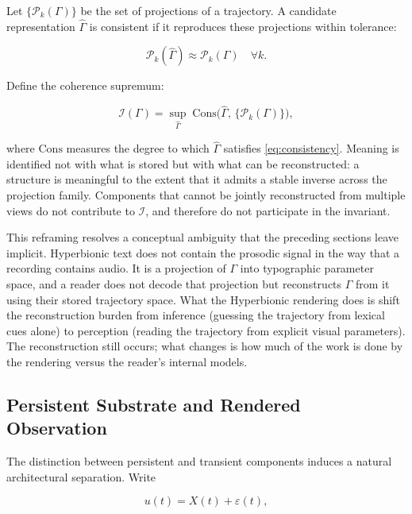 \documentclass[12pt, a4paper]{article}
\begin{document}
Let $\{\mathcal{P}_k(\Gamma)\}$ be the set of projections of a trajectory. A candidate representation $\hat{\Gamma}$ is consistent if it reproduces these projections within tolerance:

\begin{equation}
\mathcal{P}_k(\hat{\Gamma}) \approx \mathcal{P}_k(\Gamma) \quad \forall k.
\label{eq:consistency}
\end{equation}

Define the coherence supremum:

\begin{equation}
\mathcal{I}(\Gamma) = \sup_{\hat{\Gamma}}\; \mathrm{Cons}\!\bigl(\hat{\Gamma},\, \{\mathcal{P}_k(\Gamma)\}\bigr),
\label{eq:coherence_sup}
\end{equation}

where $\mathrm{Cons}$ measures the degree to which $\hat{\Gamma}$ satisfies \eqref{eq:consistency}. Meaning is identified not with what is stored but with what can be reconstructed: a structure is meaningful to the extent that it admits a stable inverse across the projection family. Components that cannot be jointly reconstructed from multiple views do not contribute to $\mathcal{I}$, and therefore do not participate in the invariant.

This reframing resolves a conceptual ambiguity that the preceding sections leave implicit. Hyperbionic text does not contain the prosodic signal in the way that a recording contains audio. It is a projection of $\Gamma$ into typographic parameter space, and a reader does not decode that projection but reconstructs $\Gamma$ from it using their stored trajectory space. What the Hyperbionic rendering does is shift the reconstruction burden from inference (guessing the trajectory from lexical cues alone) to perception (reading the trajectory from explicit visual parameters). The reconstruction still occurs; what changes is how much of the work is done by the rendering versus the reader's internal models.

\subsection{Persistent Substrate and Rendered Observation}

The distinction between persistent and transient components induces a natural architectural separation. Write

\begin{equation}
u(t) = X(t) + \varepsilon(t),
\label{eq:substrate_noise}
\end{equation}
\end{document}
